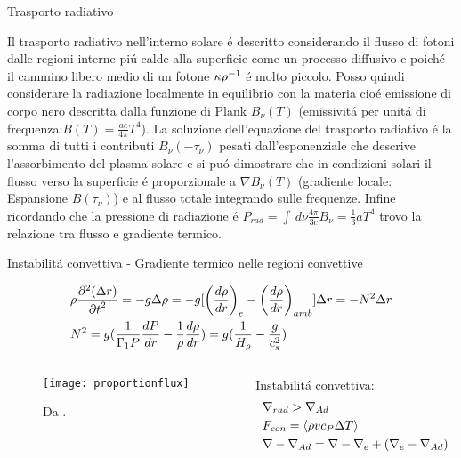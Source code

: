 \documentclass[10pt,xcolor={usenames},fleqn,mathserif,serif]{beamer}
\begin{document}
\begin{wordonframe}{Trasporto radiativo}

Il trasporto radiativo nell'interno solare \'e descritto considerando il flusso di fotoni  dalle regioni interne pi\'u calde alla superficie come un processo diffusivo e poich\'e il cammino libero medio di un fotone ${\kappa\rho}^{-1}$ \'e molto piccolo. Posso quindi considerare la radiazione localmente in equilibrio con la materia cio\'e emissione di corpo nero descritta dalla funzione di Plank $B_{\nu}(T)$ (emissivit\'a per unit\'a di frequenza:$B(T)=\frac{ac}{4\pi}T^4$). La soluzione dell'equazione del trasporto radiativo \'e la somma di tutti i contributi $B_{\nu}(-\tau_{\nu})$ pesati dall'esponenziale che descrive l'assorbimento del plasma solare e si pu\'o dimostrare che in condizioni solari il flusso verso la superficie \'e proporzionale a $\nabla B_{\nu}(T)$ (gradiente locale: Espansione $B(\tau_{\nu})$) e al flusso totale integrando sulle frequenze. Infine ricordando che la pressione di radiazione \'e $P_{rad}=\int\,d\nu\frac{4\pi}{3c}B_{\nu}=\frac{1}{3}aT^4$ trovo la relazione tra flusso e gradiente termico.

\end{wordonframe}

\begin{frame}{Instabilit\'a convettiva - Gradiente termico nelle regioni convettive}

\begin{align*}
&\rho\PtwoDy{t}{(\Delta r)}=-g\Delta\rho=-g[\Dcvar{\TDy{r}{\rho}}{e}-\Dcvar{\TDy{r}{\rho}}{amb}]\Delta r=-N^2\Delta r\\
&N^2=g(\frac{1}{\Gamma_1P}\TDy{r}{P}-\frac{1}{\rho}\TDy{r}{\rho})=g(\frac{1}{\densityscale{}}-\frac{g}{c_s^2})%
\end{align*}

\begin{columns}[t]

\begin{column}{0.6\textwidth}

\begin{figure}[!h]
    \texttt{[image: proportionflux]}
    \caption{Da \cite{christensen1997effects}.}
    \label{fluxproportion}
\end{figure}

\end{column}

\begin{column}{0.4\textwidth}
Instabilit\'a convettiva:
\begin{align*}
&\nrad{}>\nad{}\\
&F_{con}=\exv{\rho vc_P\Delta T}\\%
&\nabla-\nad=\nabla-\nabla_e+(\nabla_e-\nad{})
\end{align*}


\end{column}

\end{columns}

\end{frame}
\end{document}
